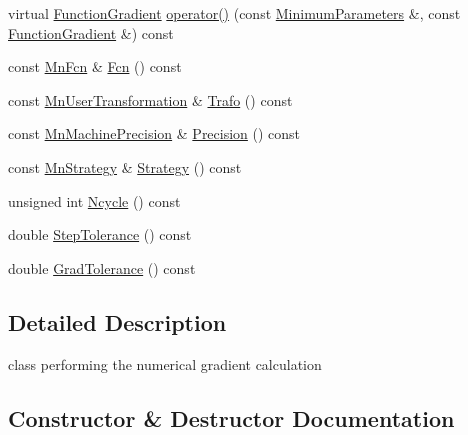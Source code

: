 \begin{DoxyCompactItemize}
\item 
virtual \mbox{\hyperlink{classROOT_1_1Minuit2_1_1FunctionGradient}{Function\+Gradient}} \mbox{\hyperlink{classROOT_1_1Minuit2_1_1Numerical2PGradientCalculator_a9ca27ef0f61a678b528f32a002e8002b}{operator()}} (const \mbox{\hyperlink{classROOT_1_1Minuit2_1_1MinimumParameters}{Minimum\+Parameters}} \&, const \mbox{\hyperlink{classROOT_1_1Minuit2_1_1FunctionGradient}{Function\+Gradient}} \&) const
\item 
const \mbox{\hyperlink{classROOT_1_1Minuit2_1_1MnFcn}{Mn\+Fcn}} \& \mbox{\hyperlink{classROOT_1_1Minuit2_1_1Numerical2PGradientCalculator_a84287ad0b3e0b38769c3ecb00cac1c22}{Fcn}} () const
\item 
const \mbox{\hyperlink{classROOT_1_1Minuit2_1_1MnUserTransformation}{Mn\+User\+Transformation}} \& \mbox{\hyperlink{classROOT_1_1Minuit2_1_1Numerical2PGradientCalculator_a5a0bce9f2c00da4aae9a2b6d3b706010}{Trafo}} () const
\item 
const \mbox{\hyperlink{classROOT_1_1Minuit2_1_1MnMachinePrecision}{Mn\+Machine\+Precision}} \& \mbox{\hyperlink{classROOT_1_1Minuit2_1_1Numerical2PGradientCalculator_a2f964953d797badaf6f2cd476e330c3f}{Precision}} () const
\item 
const \mbox{\hyperlink{classROOT_1_1Minuit2_1_1MnStrategy}{Mn\+Strategy}} \& \mbox{\hyperlink{classROOT_1_1Minuit2_1_1Numerical2PGradientCalculator_a71eb0622c53ddf5d3d319fa676cbbd6e}{Strategy}} () const
\item 
unsigned int \mbox{\hyperlink{classROOT_1_1Minuit2_1_1Numerical2PGradientCalculator_ace5b19ee0df4e3cd09333f519112d2b3}{Ncycle}} () const
\item 
double \mbox{\hyperlink{classROOT_1_1Minuit2_1_1Numerical2PGradientCalculator_afb1bbda7e079db02b02b790e0b0f6cca}{Step\+Tolerance}} () const
\item 
double \mbox{\hyperlink{classROOT_1_1Minuit2_1_1Numerical2PGradientCalculator_aa0011cbece7254c7e17f053916e01c65}{Grad\+Tolerance}} () const
\end{DoxyCompactItemize}


\subsection{Detailed Description}
class performing the numerical gradient calculation 

\subsection{Constructor \& Destructor Documentation}
\mbox{\label{classROOT_1_1Minuit2_1_1Numerical2PGradientCalculator_ab9e5f93630233d189cb8856753a2cff8}} 
